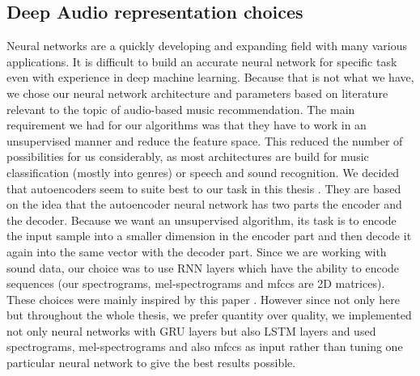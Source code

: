 \subsection{Deep Audio representation choices}
Neural networks are a quickly developing and expanding field with many various applications. It is difficult to build an accurate neural network for specific task even with experience in deep machine learning. Because that is not what we have, we chose our neural network architecture and parameters based on literature relevant to the topic of audio-based music recommendation. The main requirement we had for our algorithms was that they have to work in an unsupervised manner and reduce the feature space. This reduced the number of possibilities for us considerably, as most architectures are build for music classification (mostly into genres) or speech and sound recognition. We decided that autoencoders seem to suite best to our task in this thesis . They are based on the idea that the autoencoder neural network has two parts the encoder and the decoder. Because we want an unsupervised algorithm, its task is to encode the input sample into a smaller dimension in the encoder part and then decode it again into the same vector with the decoder part. Since we are working with sound data, our choice was to use RNN layers which have the ability to encode sequences (our spectrograms, mel-spectrograms and mfccs are 2D matrices). These choices were mainly inspired by this paper \cite{inproceedings_RNNs}. However since not only here but throughout the whole thesis, we prefer quantity over quality, we implemented not only neural networks with GRU layers but also LSTM layers and used spectrograms, mel-spectrograms and also mfccs as input rather than tuning one particular neural network to give the best results possible. 